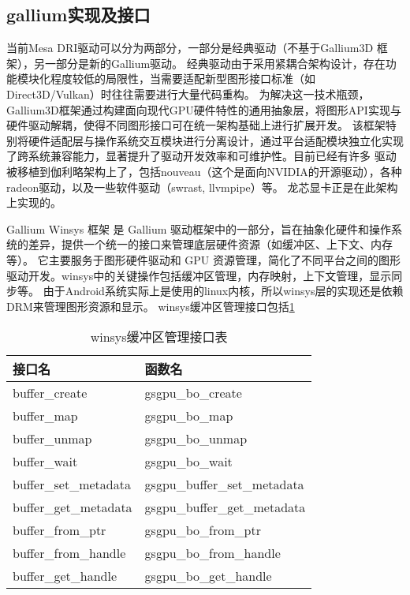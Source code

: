 \subsection{gallium实现及接口}
当前Mesa DRI驱动可以分为两部分，一部分是经典驱动（不基于Gallium3D 框架），另一部分是新的Gallium驱动。 
经典驱动由于采用紧耦合架构设计，存在功能模块化程度较低的局限性，当需要适配新型图形接口标准（如Direct3D/Vulkan）时往往需要进行大量代码重构。
为解决这一技术瓶颈，Gallium3D框架通过构建面向现代GPU硬件特性的通用抽象层，将图形API实现与硬件驱动解耦，使得不同图形接口可在统一架构基础上进行扩展开发。
该框架特别将硬件适配层与操作系统交互模块进行分离设计，通过平台适配模块独立化实现了跨系统兼容能力，显著提升了驱动开发效率和可维护性。目前已经有许多
驱动被移植到伽利略架构上了，包括nouveau（这个是面向NVIDIA的开源驱动），各种radeon驱动，以及一些软件驱动（swrast, llvmpipe）等。
龙芯显卡正是在此架构上实现的。

Gallium Winsys 框架 是 Gallium 驱动框架中的一部分，旨在抽象化硬件和操作系统的差异，提供一个统一的接口来管理底层硬件资源（如缓冲区、上下文、内存等）。
它主要服务于图形硬件驱动和 GPU 资源管理，简化了不同平台之间的图形驱动开发。winsys中的关键操作包括缓冲区管理，内存映射，上下文管理，显示同步等。
由于Android系统实际上是使用的linux内核，所以winsys层的实现还是依赖DRM来管理图形资源和显示。
winsys缓冲区管理接口包括\ref{tab:winsys缓冲区管理接口表}

\begin{table}[h]
  \centering
  \caption{winsys缓冲区管理接口表}
  \label{tab:winsys缓冲区管理接口表}
  \begin{tabular}{ll}
    \toprule
    接口名  & 函数名 \\
    \midrule
    buffer\_create & gsgpu\_bo\_create  \\
    buffer\_map & gsgpu\_bo\_map \\
    buffer\_unmap & gsgpu\_bo\_unmap \\
    buffer\_wait & gsgpu\_bo\_wait \\
    buffer\_set\_metadata & gsgpu\_buffer\_set\_metadata \\
    buffer\_get\_metadata & gsgpu\_buffer\_get\_metadata \\
    buffer\_from\_ptr & gsgpu\_bo\_from\_ptr \\
    buffer\_from\_handle & gsgpu\_bo\_from\_handle \\
    buffer\_get\_handle & gsgpu\_bo\_get\_handle \\
    \bottomrule
  \end{tabular}
  \note{}
\end{table}

